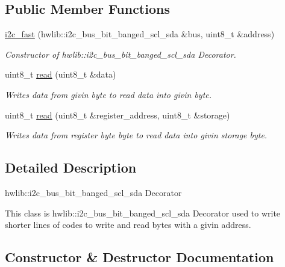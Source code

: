 \subsection*{Public Member Functions}
\begin{DoxyCompactItemize}
\item 
\hyperlink{classi2c__fast_a2409918a4b030ad310e9b145e1056eb2}{i2c\+\_\+fast} (hwlib\+::i2c\+\_\+bus\+\_\+bit\+\_\+banged\+\_\+scl\+\_\+sda \&bus, uint8\+\_\+t \&address)
\begin{DoxyCompactList}\small\item\em Constructor of hwlib\+::i2c\+\_\+bus\+\_\+bit\+\_\+banged\+\_\+scl\+\_\+sda Decorator. \end{DoxyCompactList}\item 
uint8\+\_\+t \hyperlink{classi2c__fast_a90f3dca1f0688fc2ae567c6ee8b6c42e}{read} (uint8\+\_\+t \&data)
\begin{DoxyCompactList}\small\item\em Writes data from givin byte to read data into givin byte. \end{DoxyCompactList}\item 
uint8\+\_\+t \hyperlink{classi2c__fast_a51ad18b2edee256e274ee8f014369b73}{read} (uint8\+\_\+t \&register\+\_\+address, uint8\+\_\+t \&storage)
\begin{DoxyCompactList}\small\item\em Writes data from register byte byte to read data into givin storage byte. \end{DoxyCompactList}\end{DoxyCompactItemize}


\subsection{Detailed Description}
hwlib\+::i2c\+\_\+bus\+\_\+bit\+\_\+banged\+\_\+scl\+\_\+sda Decorator 

This class is hwlib\+::i2c\+\_\+bus\+\_\+bit\+\_\+banged\+\_\+scl\+\_\+sda Decorator used to write shorter lines of codes to write and read bytes with a givin address. 

\subsection{Constructor \& Destructor Documentation}
\mbox{\label{classi2c__fast_a2409918a4b030ad310e9b145e1056eb2}} 

